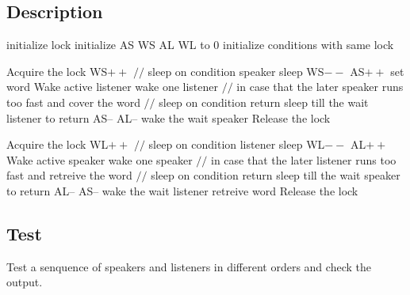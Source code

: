 \documentclass{article}
\begin{document}
\subsection{Description}
\begin{algorithm}
  \begin{algorithmic}
			\State initialize lock
			\State initialize AS WS AL WL to 0
			\State initialize conditions with same lock
		\EndProcedure
  \end{algorithmic}
	\begin{algorithmic}
			\State Acquire the lock
				\State WS$++$
				\State $//$ sleep on condition speaker
				\State sleep
				\State WS$--$
			\EndWhile
			\State AS$++$
			\State set word
				\State Wake active listener
			\Else
					\State wake one listener
				\EndIf
				\State $//$ in case that the later speaker runs too fast and cover the word
				\State $//$ sleep on condition return
				\State sleep till the wait listener to return 		
				\State AS--
				\State AL--
					\State wake the wait speaker
				\EndIf
			\EndIf
			\State Release the lock
			\State \Return
		\EndProcedure
  \end{algorithmic}
\end{algorithm}
\begin{algorithm}
	\begin{algorithmic}
			\State Acquire the lock
				\State WL$++$
				\State $//$ sleep on condition listener
				\State sleep
				\State WL$--$
			\EndWhile
			\State AL$++$
				\State Wake active speaker
			\Else
					\State wake one speaker
				\EndIf
				\State $//$ in case that the later listener runs too fast and retreive the word
				\State $//$ sleep on condition return
				\State sleep till the wait speaker to return 		
				\State AL--
				\State AS--
					\State wake the wait listener
				\EndIf
			\EndIf
			\State retreive word
			\State Release the lock
			\State \Return
		\EndProcedure
  \end{algorithmic}
\end{algorithm}
\subsection{Test}
Test a senquence of speakers and listeners in different orders and check the output.
\end{document}
